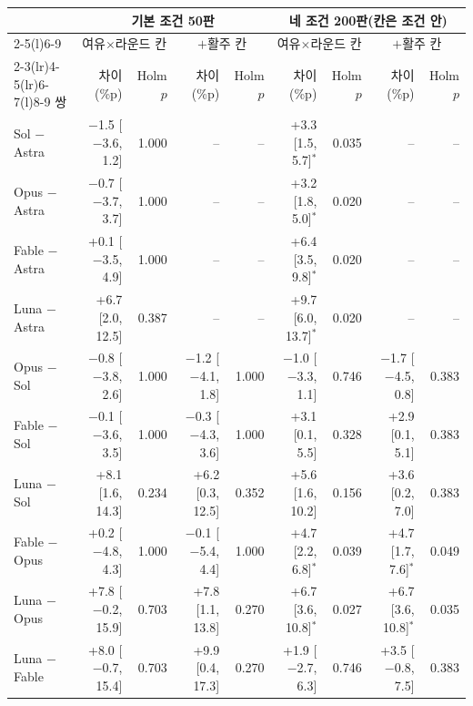 \begin{tabular}{lrrrrrrrr}
\toprule
 & \multicolumn{4}{c}{기본 조건 50판} & \multicolumn{4}{c}{네 조건 200판(칸은 조건 안)} \\
\cmidrule(lr){2-5}\cmidrule(l){6-9}
 & \multicolumn{2}{c}{여유$\times$라운드 칸} & \multicolumn{2}{c}{$+$활주 칸} & \multicolumn{2}{c}{여유$\times$라운드 칸} & \multicolumn{2}{c}{$+$활주 칸} \\
\cmidrule(lr){2-3}\cmidrule(lr){4-5}\cmidrule(lr){6-7}\cmidrule(l){8-9}
쌍 & 차이(\%p) & Holm $p$ & 차이(\%p) & Holm $p$ & 차이(\%p) & Holm $p$ & 차이(\%p) & Holm $p$ \\
\midrule
Sol $-$ Astra & $-$1.5 [$-$3.6, 1.2] & 1.000 & -- & -- & +3.3 [1.5, 5.7]$^{*}$ & 0.035 & -- & -- \\
Opus $-$ Astra & $-$0.7 [$-$3.7, 3.7] & 1.000 & -- & -- & +3.2 [1.8, 5.0]$^{*}$ & 0.020 & -- & -- \\
Fable $-$ Astra & +0.1 [$-$3.5, 4.9] & 1.000 & -- & -- & +6.4 [3.5, 9.8]$^{*}$ & 0.020 & -- & -- \\
Luna $-$ Astra & +6.7 [2.0, 12.5] & 0.387 & -- & -- & +9.7 [6.0, 13.7]$^{*}$ & 0.020 & -- & -- \\
Opus $-$ Sol & $-$0.8 [$-$3.8, 2.6] & 1.000 & $-$1.2 [$-$4.1, 1.8] & 1.000 & $-$1.0 [$-$3.3, 1.1] & 0.746 & $-$1.7 [$-$4.5, 0.8] & 0.383 \\
Fable $-$ Sol & $-$0.1 [$-$3.6, 3.5] & 1.000 & $-$0.3 [$-$4.3, 3.6] & 1.000 & +3.1 [0.1, 5.5] & 0.328 & +2.9 [0.1, 5.1] & 0.383 \\
Luna $-$ Sol & +8.1 [1.6, 14.3] & 0.234 & +6.2 [0.3, 12.5] & 0.352 & +5.6 [1.6, 10.2] & 0.156 & +3.6 [0.2, 7.0] & 0.383 \\
Fable $-$ Opus & +0.2 [$-$4.8, 4.3] & 1.000 & $-$0.1 [$-$5.4, 4.4] & 1.000 & +4.7 [2.2, 6.8]$^{*}$ & 0.039 & +4.7 [1.7, 7.6]$^{*}$ & 0.049 \\
Luna $-$ Opus & +7.8 [$-$0.2, 15.9] & 0.703 & +7.8 [1.1, 13.8] & 0.270 & +6.7 [3.6, 10.8]$^{*}$ & 0.027 & +6.7 [3.6, 10.8]$^{*}$ & 0.035 \\
Luna $-$ Fable & +8.0 [$-$0.7, 15.4] & 0.703 & +9.9 [0.4, 17.3] & 0.270 & +1.9 [$-$2.7, 6.3] & 0.746 & +3.5 [$-$0.8, 7.5] & 0.383 \\
\bottomrule
\end{tabular}
